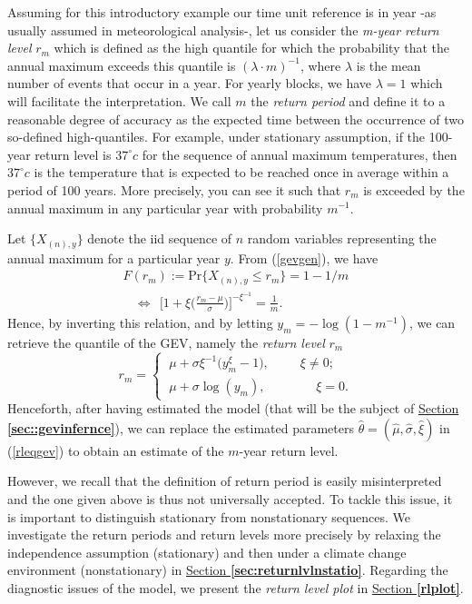 Assuming for this introductory example our time unit reference is in year -as usually assumed in meteorological analysis-, let us consider the \emph{m-year return level} $r_m$ which is defined as the high quantile for which the probability that the annual maximum exceeds this quantile is $(\lambda\cdot m)^{-1}$, where $\lambda$ is the mean number of events that occur in a year. For yearly blocks, we have $\lambda=1$ which will facilitate the interpretation. We call $m$ the \emph{return period} and define it to a reasonable degree of accuracy as the expected time between the occurrence of two so-defined high-quantiles. For example, under stationary assumption, if the 100-year return level is $37^{\circ} c$ for the sequence of annual maximum temperatures, then $37^{\circ} c$ is the temperature that is expected to be reached once in average within a period of 100 years. More precisely, you can see it such that $r_m$ is exceeded by the annual maximum in any particular year with probability $m^{-1}$.

Let $\{X_{(n),y}\}$ denote the iid sequence of $n$ random variables representing the annual maximum for a particular year $y$. From (\ref{gevgen}), we have
\begin{align*}
F(r_m):=\text{Pr}\{X_{(n),y}\leq r_m\}=1-1/m 
\\ \ \ \ \ \Leftrightarrow \ \ \Bigg[1+\xi\bigg(\frac{r_m-\mu}{\sigma}\bigg)\Bigg]^{-\xi^{-1}}=\frac{1}{m}.
\end{align*}
Hence, by inverting this relation, and by letting $y_m=-\log(1-m^{-1})$, we can retrieve the quantile of the GEV, namely the \emph{return level} $r_m$
\begin{equation}\label{rleqgev}
r_m=\begin{cases}
\ \mu+\sigma\xi^{-1}\big(y_m^{\xi}-1\big), \ \ \ \ \ \ \ \  \ \ \  \xi\neq 0;\\
\ \mu +\sigma \log(y_m), \ \ \ \ \ \ \ \ \ \  \ \ \ \ \ \ \ \ \xi =0.
\end{cases}
\end{equation}
Henceforth, after having estimated the model (that will be the subject of \hyperref[sec::gevinfernce]{Section \textbf{\ref{sec::gevinfernce}}}), we can replace the estimated parameters $\hat{\theta}=(\hat{\mu},\hat{\sigma},\hat{\xi})$ in (\ref{rleqgev}) to obtain an estimate of the $m$-year return level.

However, we recall that the definition of return period is easily misinterpreted and the one given above is thus not universally accepted. %
To tackle this issue, it is important to distinguish stationary from nonstationary sequences.
We investigate the return periods and return levels
more precisely by relaxing the independence assumption (stationary) and then under a climate change environment (nonstationary) in \hyperref[sec:returnlvlnstatio]{Section \textbf{\ref{sec:returnlvlnstatio}}}.
Regarding the diagnostic issues of the model, we present the \emph{return level plot} in \hyperref[rlplot]{Section \textbf{\ref{rlplot}}}.


